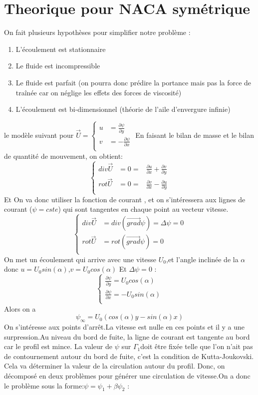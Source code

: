 \documentclass[a4paper,10pt]{report} %
\begin{document}
\section{Theorique pour NACA symétrique}%
On fait plusieurs hypothèses pour simplifier notre problème :
\begin{enumerate} 
	\item L'écoulement est stationnaire
	\item Le fluide est incompressible
	\item Le fluide est parfait (on pourra donc prédire la portance mais pas la force de traînée car on néglige les effets des forces de viscosité)
    \item L'écoulement est bi-dimensionnel (théorie de l'aile d'envergure infinie)
    
\end{enumerate} 
le modèle suivant pour $\vec{U}=\left\{
\begin{aligned}
u&= \frac{\partial{\psi}}{\partial{y}} \\
v&= -\frac{\partial{\psi}}{\partial{x}} \\
\end{aligned}
\right.
$
En faisant le bilan de masse et le bilan de quantité de mouvement, on obtient:
$$\left\{
\begin{aligned}
div\vec{U}&=0=&\frac{\partial{u}}{\partial{x}}+\frac{\partial{v}}{\partial{y}} \\
rot\vec{U}&=0=&\frac{\partial{v}}{\partial{x}}-\frac{\partial{u}}{\partial{y}} \\
\end{aligned}
\right.
$$
Et On va donc utiliser la fonction de courant  , et on s'intéressera aux lignes de courant ($\psi = cste$) qui sont tangentes en chaque point au vecteur vitesse.
$$\left\{
\begin{aligned}
div\vec{U}&=div(\vec{grad}\psi)=\Delta\psi=0 \\
rot\vec{U}&=rot(\vec{grad}\psi)=0 \\
\end{aligned}
\right.
$$
On met un écoulement qui arrive avec
une vitesse $U_{0}$,et l'angle inclinée de la $\alpha$ donc $u=U_{0}sin(\alpha)$,$v=U_{0}cos(\alpha)$
Et $ \Delta\psi=0 $ :
$$\left\{
\begin{aligned}\frac{\partial{\psi}}{\partial{y}}=U_{0}cos(\alpha)  \\
\frac{\partial{\psi}}{\partial{x}}=-U_{0}sin(\alpha)  \\
\end{aligned}
\right.
$$
Alors on a $$\psi_{\infty}=U_{0}(cos(\alpha) y-sin(\alpha)x)$$
On s'intéresse aux points d'arrêt.La vitesse est nulle en ces points et il y a une surpression.Au niveau du bord de fuite, la ligne de courant est tangente au bord car le profil est mince. La valeur de $\psi$ sur $\Gamma_{1}$doit être fixée telle que l'on n'ait pas de contournement autour du bord de fuite, c'est la condition de Kutta-Joukovski. Cela va déterminer la valeur de la circulation autour du profil.
Donc, on décomposé en deux problèmes pour générer une circulation de vitesse.On a donc le problème sous la forme:$\psi=\psi_{1}+\beta\psi_{2}$ :
\end{document}
